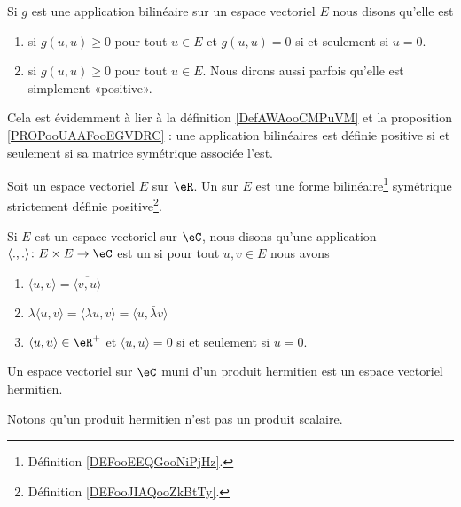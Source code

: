 \begin{definition}      \label{DEFooJIAQooZkBtTy}
    Si $g$ est une application bilinéaire sur un espace vectoriel \( E\) nous disons qu'elle est
    \begin{enumerate}
        \item
             si $g(u,u)\geq 0$ pour tout $u\in E$ et $g(u,u)=0$ si et seulement si $u=0$.
        \item
             si $g(u,u)\geq 0$ pour tout $u\in E$. Nous dirons aussi parfois qu'elle est simplement «positive».
        \end{enumerate}
\end{definition}
Cela est évidemment à lier à la définition \ref{DefAWAooCMPuVM} et la proposition \ref{PROPooUAAFooEGVDRC} : une application bilinéaires est définie positive si et seulement si sa matrice symétrique associée l'est.

\begin{definition}\label{DefVJIeTFj}
    Soit un espace vectoriel \( E\) sur \( \eR\). Un  sur \( E\) est une forme bilinéaire\footnote{Définition \ref{DEFooEEQGooNiPjHz}.} symétrique strictement définie positive\footnote{Définition \ref{DEFooJIAQooZkBtTy}.}.
\end{definition}

\begin{definition}  \label{DefMZQxmQ}
    Si \( E\) est un espace vectoriel sur \( \eC\), nous disons qu'une application \( \langle ., .\rangle \colon E\times E\to \eC\) est un  si pour tout \( u,v\in E\) nous avons
    \begin{enumerate}
        \item
            \( \langle u, v\rangle =\overline{ \langle v, u\rangle  }\)
        \item
            \( \lambda\langle u, v\rangle =\langle \lambda u, v\rangle =\langle u, \bar \lambda v\rangle \)
        \item
            \( \langle u, u\rangle \in \eR^+\) et \( \langle u, u\rangle =0\) si et seulement si \( u=0\).
    \end{enumerate}
    Un espace vectoriel sur \( \eC\) muni d'un produit hermitien est un espace vectoriel hermitien.
\end{definition}
Notons qu'un produit hermitien n'est pas un produit scalaire.

